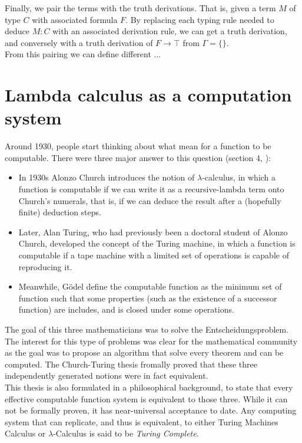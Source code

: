 Finally, we pair the terms  with the truth derivations. That is, given a term $M$  of type $C$ with associated formula $F$. By replacing each typing rule needed to deduce $M:C$  with an associated derivation rule, we can get a truth derivation, and conversely with a truth derivation of $F\to \top$ from $\Gamma=\{\}$.\\

From this pairing we can define different ...

\section{Lambda calculus as a computation system}
Around 1930, people start thinking about what mean for a function to be computable. There were three major answer to this question (section 4, \cite{cardone2006history}):
\begin{itemize}
\item In 1930s Alonzo Church introduces the notion of $\lambda$-calculus, in which a function is computable if we can write it as a recursive-lambda term onto Church's numerals, that is, if we can deduce the result after a (hopefully finite) deduction steps.
\item Later, Alan Turing, who had previously been a doctoral student of Alonzo Church, developed the concept of the Turing machine, in which a function is computable if a tape machine with a limited set of operations is capable of reproducing it.
\item Meanwhile, Gödel define the computable function as the minimum set of function such that some properties (such as the existence of a successor function) are includes, and is closed under some operations. 
\end{itemize}

The goal of this three mathematicians was to solve the Entscheidungsproblem\cite{hilbert1999principles}.\\

The interest for this type of problems was clear for the mathematical community as the goal was to propose an algorithm that solve every theorem and can be computed. The Church-Turing thesis fromally proved that these three independently generated notions were in fact equivalent\cite{copeland1997church}.\\


This thesis is also formulated in a philosophical background, to state that every effective computable function system is equivalent to those three. While it can not be formally proven, it has near-universal acceptance to date. Any computing system that can replicate, and thus is equivalent, to either Turing Machines Calculus or $\lambda$-Calculus is said to be \emph{Turing Complete}.\\

